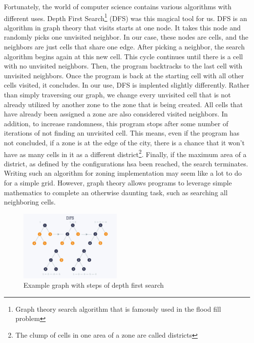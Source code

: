 \documentclass[11pt]{article}
\begin{document}
\begin{multicols}{2}
    \quad Fortunately, the world of computer science contains various algorithms with different uses. Depth First Search\footnote{Graph theory search algorithm that is famously used in the flood fill problem} (DFS) was this magical tool for us. DFS is an algorithm in graph theory that visits starts at one node. It takes this node and randomly picks one unvisited neighbor. In our case, these nodes are cells, and the neighbors are just cells that share one edge. After picking a neighbor, the search algorithm begins again at this new cell. This cycle continues until there is a cell with no unvisited neighbors. Then, the program backtracks to the last cell with unvisited neighbors. Once the program is back at the starting cell with all other cells visited, it concludes. In our use, DFS is implented slightly differently. Rather than simply traversing our graph, we change every unvisited cell that is not already utilized by another zone to the zone that is being created. All cells that have already been assigned a zone are also considered visited neighbors. In addition, to increase randomness, this program stops after some number of iterations of not finding an unvisited cell. This means, even if the program has not concluded, if a zone is at the edge of the city, there is a chance that it won't have as many cells in it as a different district\footnote{The clump of cells in one area of a zone are called districts}. Finally, if the maximum area of a district, as defined by the configurations hsa been reached, the search terminates. Writing such an algorithm for zoning implementation may seem like a lot to do for a simple grid. However, graph theory allows programs to leverage simple mathematics to complete an otherwise daunting task, such as searching all neighboring cells.

    \begin{figure}[H]
        \centering
        \includegraphics[width=0.45\textwidth]{images/depthfirstsearch.jpg}
        \caption{Example graph with steps of depth first search \cite{depthfirstsearch}}
        \label{fig:depth-first-search}
    \end{figure}


\end{multicols}
\end{document}
